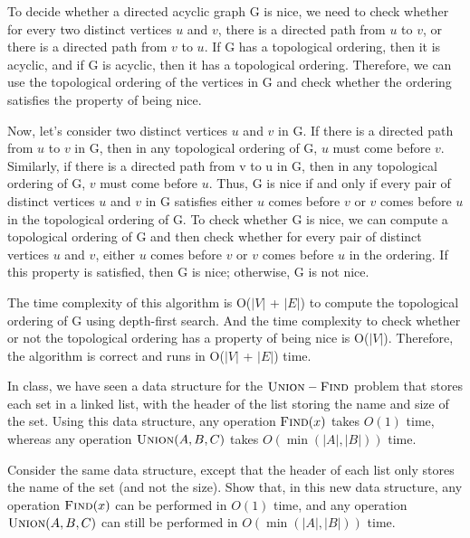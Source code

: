 \documentclass[12pt]{article}
\newcommand{\UNION}{\textsf{\sc Union}}
\newcommand{\FIND}{\textsf{\sc Find}}
\newcounter{ques}
\newenvironment{question}{\stepcounter{ques}{\noindent\bf Question \arabic{ques}:}}{\vspace{5mm}}
\newenvironment{solution}{{\noindent\bf Solution:}}{\vspace{5mm}}
\begin{document}
\begin{solution}
      
      To decide whether a directed acyclic graph G is nice, we need to check whether for every two distinct vertices $u$ and $v$, there is a directed path from $u$ to $v$, or there is a directed path from $v$ to $u$. 
      If G has a topological ordering, then it is acyclic, and if G is acyclic, then it has a topological ordering.
      Therefore, we can use the topological ordering of the vertices in G and check whether the ordering satisfies the property of being nice.

      Now, let's consider two distinct vertices $u$ and $v$ in G. 
      If there is a directed path from $u$ to $v$ in G, then in any topological ordering of G, $u$ must come before $v$. 
      Similarly, if there is a directed path from v to u in G, then in any topological ordering of G, $v$ must come before $u$. 
      Thus, G is nice if and only if every pair of distinct vertices $u$ and $v$ in G satisfies either $u$ comes before $v$ or $v$ comes before $u$ in the topological ordering of G.
      To check whether G is nice, we can compute a topological ordering of G and then check whether for every pair of distinct vertices $u$ and $v$, either $u$ comes before $v$ or $v$ comes before $u$ in the ordering. 
      If this property is satisfied, then G is nice; otherwise, G is not nice.
      
      The time complexity of this algorithm is O($|V|$ + $|E|$) to compute the topological ordering of G using depth-first search.
      And the time complexity to check whether or not the topological ordering has a property of being nice is O($|V|$).
      Therefore, the algorithm is correct and runs in O($|V|$ + $|E|$) time.
\end{solution}

\newpage 

\begin{question}
In class, we have seen a data structure for the $\UNION-\FIND$ problem
that stores each set in a linked list, with the header of the list
storing the name and size of the set. Using this data structure, any
operation $\FIND(x)$ takes $O(1)$ time, whereas any operation
$\UNION(A,B,C)$ takes $O(\min(|A|,|B|))$ time.

Consider the same data structure, except that the header of each list
only stores the name of the set (and not the size). Show that, in
this new data structure, any operation $\FIND(x)$ can be performed in
$O(1)$ time, and any operation $\UNION(A,B,C)$ can still be
performed in $O(\min(|A|,|B|))$ time.
\end{question}
\end{document}
